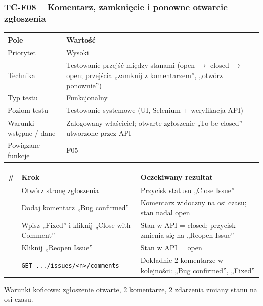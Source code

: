 \subsubsection{TC-F08 – Komentarz, zamknięcie i ponowne otwarcie zgłoszenia}
{\small
\par\smallskip\noindent\begin{tabular}{>{\raggedright\arraybackslash}p{}>{\raggedright\arraybackslash}p{}}
\toprule
\textbf{Pole} & \textbf{Wartość} \\
\midrule
Priorytet & Wysoki \\
Technika & Testowanie przejść między stanami (open $\rightarrow$ closed $\rightarrow$ open; przejścia „zamknij z komentarzem”, „otwórz ponownie”) \\
Typ testu & Funkcjonalny \\
Poziom testu & Testowanie systemowe (UI, Selenium + weryfikacja API) \\
Warunki wstępne / dane & Zalogowany właściciel; otwarte zgłoszenie „To be closed” utworzone przez API \\
Powiązane funkcje & F05 \\
\bottomrule
\end{tabular}\par\smallskip
}
{\small
\par\smallskip\noindent\begin{tabular}{>{\raggedright\arraybackslash}p{}>{\raggedright\arraybackslash}p{}>{\raggedright\arraybackslash}p{}}
\toprule
\textbf{\#} & \textbf{Krok} & \textbf{Oczekiwany rezultat} \\
\midrule
1 & Otwórz stronę zgłoszenia & Przycisk statusu „Close Issue” \\
2 & Dodaj komentarz „Bug confirmed” & Komentarz widoczny na osi czasu; stan nadal open \\
3 & Wpisz „Fixed” i kliknij „Close with Comment” & Stan w API = closed; przycisk zmienia się na „Reopen Issue” \\
4 & Kliknij „Reopen Issue” & Stan w API = open \\
5 & \texttt{GET .../\allowbreak{}issues/\allowbreak{}<n>/\allowbreak{}comments} & Dokładnie 2 komentarze w kolejności: „Bug confirmed”, „Fixed” \\
\bottomrule
\end{tabular}\par\smallskip
}
Warunki końcowe: zgłoszenie otwarte, 2 komentarze, 2 zdarzenia zmiany stanu na osi czasu.

